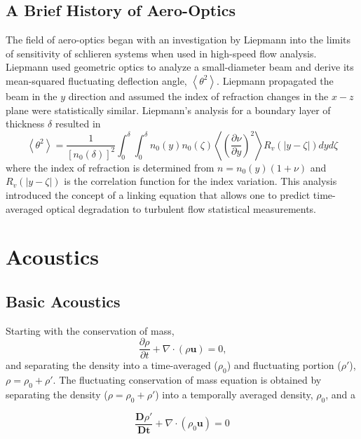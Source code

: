 \subsection{A Brief History of Aero-Optics}
The field of aero-optics began with an investigation by Liepmann \cite{Liepmann-1952-89GQ7wyA} into the limits of sensitivity of schlieren systems when used in high-speed flow analysis.
Liepmann used geometric optics to analyze a small-diameter beam and derive its mean-squared fluctuating deflection angle, $\left<\theta^2\right>$.
Liepmann propagated the beam in the $y$ direction and assumed the index of refraction changes in the $x-z$ plane were statistically similar.
Liepmann's analysis for a boundary layer of thickness $\delta$ resulted in
\begin{equation}
  \left<\theta^2\right> = \frac{1}{[n_0(\delta)]^2}\int_0^\delta\int_0^\delta n_0(y)n_0(\zeta)\left<\left(\frac{\partial\nu}{\partial y}\right)^2\right>R_v(|y-\zeta|)dyd\zeta
  \label{eqn:02_liepmann_deflection_angle}
\end{equation}
where the index of refraction is determined from $n=n_0(y)(1+\nu)$ and $R_v(|y-\zeta|)$ is the correlation function for the index variation.
This analysis introduced the concept of a linking equation that allows one to predict time-averaged optical degradation to turbulent flow statistical measurements.

\section{Acoustics}

\subsection{Basic Acoustics}


Starting with the conservation of mass,
\begin{equation}
  \frac{\partial\rho}{\partial t}+\nabla\cdot\left(\rho\mathbf{u}\right)=0  \textrm{,}
  \label{eqn:02_cons_of_mass}
\end{equation}
and separating the density into a time-averaged ($\rho_0$) and fluctuating portion ($\rho'$), $\rho = \rho_0+\rho'$.
The fluctuating conservation of mass equation is obtained by separating the density ($\rho = \rho_0+\rho'$) into a temporally averaged density, $\rho_0$, and a

\begin{equation}
  \frac{\mathbf{D}\rho'}{\mathbf{Dt}}+\nabla\cdot\left(\rho_0\mathbf{u}\right)=0
  \label{eqn:02_cons_of_mass_fluc}
\end{equation}





